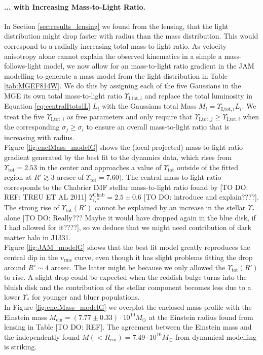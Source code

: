 \paragraph{... with Increasing Mass-to-Light Ratio.} In Section \ref{sec:results_lensing} we found from the lensing, that the light distribution might drop faster with radius than the mass distribution. This would correspond to a radially increasing total mass-to-light ratio. As velocity anisotropy alone cannot explain the observed kinematics in a simple a mass-follows-light model, we now allow for an mass-to-light ratio gradient in the JAM modelling to generate a mass model from the light distribution in Table \ref{tab:MGEF814W}. We do this by assigning each of the five Gaussians in the MGE its own total mass-to-light ratio $\Upsilon_{\text{I,tot},i}$ and replace the total luminosity in Equation \ref{eq:centralItotalL} $L_i$ with the Gaussians total Mass $M_i = \Upsilon_{\text{I,tot},i} L_i$. We treat the five $\Upsilon_{\text{I,tot},i}$ as free parameters and only require that $\Upsilon_{\text{I,tot},j} \geq \Upsilon_{\text{I,tot},i}$ when the corresponding $\sigma_j \geq \sigma_i$ to ensure an overall mass-to-light ratio that is increasing with radius.
\\Figure \ref{fig:enclMass_modelG} shows the (local projected) mass-to-light ratio gradient generated by the best fit to the dynamics data, which rises from $\Upsilon_\text{tot} = 2.53$ in the center and approaches a value of $\Upsilon_\text{tot}$ outside of the fitted region at $R'\gtrsim 3$ arcsec of $\Upsilon_\text{tot} = 7.60)$. The central mass-to-light ratio corresponds to the Chabrier IMF stellar mass-to-light ratio found by [TO DO: REF: TREU ET AL 2011] $\Upsilon_{i,*}^\text{Chab} = 2.5 \pm 0.6$ [TO DO: introduce and explain????]. The strong rise of $\Upsilon_\text{tot}(R')$ cannot be explained by an increase in the stellar $\Upsilon_*$ alone [TO DO: Really??? Maybe it would have dropped again in the blue disk, if I had allowed for it????], so we deduce that we might need  contribution of dark matter halo in J1331.
\\Figure \ref{fig:JAM_modelG} shows that the best fit model greatly reproduces the central dip in the $v_\text{rms}$ curve, even though it has slight problems fitting the drop around $R' \sim 4$ arcsec. The latter might be because we only allowed the $\Upsilon_\text{tot}(R')$ to rise. A slight drop could be expected when the reddish bulge turns into the bluish disk and the contribution of the stellar component becomes less due to a lower $\Upsilon_{*}$ for younger and bluer populations.
\\In Figure \ref{fig:enclMass_modelG} we overplot the enclosed mass profile with the Einstein mass $M_\text{ein} = (7.77 \pm 0.33) \cdot 10^{10} M_\odot$ at the Einstein radius found from lensing in Table [TO DO: REF]. The agreement between the Einstein mass and the independently found $M(<R_\text{ein}) = 7.49 \cdot 10^{10} M_\odot$ from dynamical modelling is striking.


